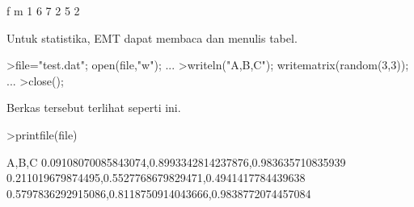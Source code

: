 \documentclass{article}
\newenvironment{eulernotebook}{\par}{\par}
\newenvironment{eulercomment}{\par\medskip}{\par\medskip}
\begin{document}
\begin{eulernotebook}
\begin{eulercomment}
\begin{eulercomment}
\begin{eulercomment}
\begin{eulercomment}
\begin{eulercomment}
\begin{eulercomment}
\begin{euleroutput}
                 f       m
         1       6       7
         2       5       2
\end{euleroutput}
\begin{eulercomment}
Untuk statistika, EMT dapat membaca dan menulis tabel.
\end{eulercomment}
\begin{eulerprompt}
>file="test.dat"; open(file,"w"); ...
>writeln("A,B,C"); writematrix(random(3,3)); ...
>close();
\end{eulerprompt}
\begin{eulercomment}
Berkas tersebut terlihat seperti ini.
\end{eulercomment}
\begin{eulerprompt}
>printfile(file)
\end{eulerprompt}
\begin{euleroutput}
  A,B,C
  0.09108070085843074,0.8993342814237876,0.983635710835939
  0.211019679874495,0.5527768679829471,0.4941417784439638
  0.5797836292915086,0.8118750914043666,0.9838772074457084
  

\end{euleroutput}
\end{eulercomment}
\end{eulercomment}
\end{eulercomment}
\end{eulercomment}
\end{eulercomment}
\end{eulercomment}
\end{eulernotebook}
\end{document}

